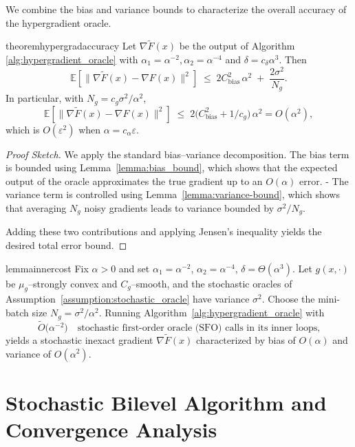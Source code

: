 \documentclass[letterpaper]{article} %
\newcommand{\1}{\mathbf{1}}
\begin{document}
We combine the bias and variance bounds to characterize the overall accuracy of the hypergradient oracle.
\begin{restatable}{theorem}{hypergradaccuracy}
\label{thm:hypergradient-accuracy}
Let $\nabla\tilde{F}(x)$ be the output of Algorithm \ref{alg:hypergradient_oracle} with $\alpha_1 = \alpha^{-2}, \alpha_2 = \alpha^{-4}$ and $\delta=c_{\delta}\alpha^3$. Then
\[
\mathbb{E}[\|\nabla\tilde{F}(x) - \nabla F(x)\|^2] \;\leq\; 2 C_{\text{bias}}^2 \, \alpha^2 \; + \; \frac{2 \sigma^2}{N_g}.
\]
In particular, with $N_g=c_g\sigma^{2}/\alpha^{2}$,
\[
\mathbb{E}[\|\nabla\tilde{F}(x) - \nabla F(x)\|^2] \;\leq\; 2\bigl(C_{\text{bias}}^{2}+1/c_g\bigr)\,\alpha^{2} = O(\alpha^{2}),
\]
which is $O(\varepsilon^{2})$ when $\alpha=c_{\alpha}\varepsilon$.
\end{restatable}
\begin{proof}[Proof Sketch]
We apply the standard bias–variance decomposition. The bias term is bounded using Lemma~\ref{lemma:bias_bound}, which shows that the expected output of the oracle approximates the true gradient up to an $O(\alpha)$ error.
- The variance term is controlled using Lemma~\ref{lemma:variance-bound}, which shows that averaging $N_g$ noisy gradients leads to variance bounded by $\sigma^2 / N_g$.

Adding these two contributions and applying Jensen’s inequality yields the desired total error bound.
\end{proof}


\begin{restatable}{lemma}{innercost}
\label{lem:inner-cost}
Fix $\alpha>0$ and set
$\alpha_1=\alpha^{-2}$, $\alpha_2=\alpha^{-4}$, $\delta=\Theta(\alpha^{3})$.
Let $g(x,\cdot)$ be $\mu_g$–strongly convex and $C_g$–smooth, and
the stochastic oracles of Assumption~\ref{assumption:stochastic_oracle} have variance $\sigma^{2}$.
Choose the mini-batch size $N_g=\sigma^{2}/\alpha^{2}$.
Running Algorithm~\ref{alg:hypergradient_oracle} with 
\[
\tilde O\!\bigl(\alpha^{-2}\bigr)
\quad\text{stochastic first-order oracle (SFO) calls in its inner loops,} 
\]
yields a stochastic inexact gradient $\nabla\tilde{F}(x)$ characterized by bias of \(O(\alpha)\) and variance of \(O(\alpha^2)\).
\end{restatable}

\section{Stochastic Bilevel Algorithm and Convergence Analysis}
\end{document}
